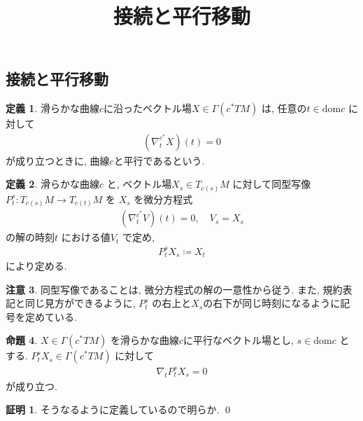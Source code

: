 \documentclass[10pt, fleqn, label-section=none]{bxjsarticle}
\title{接続と平行移動}
\date{}
\author{}
\theoremstyle{definition}
\newtheorem{dfn}{定義}[section]
\newtheorem{prop}[dfn]{命題}
\newtheorem*{pf*}{証明}
\newtheorem{remark}[dfn]{注意}
\newcommand{\dom}{\textrm{dom}}
\renewcommand{\;}{\, ; \,}
\begin{document}
\maketitle

\section{}

\subsection{接続と平行移動}

\begin{dfn}滑らかな曲線$c$に沿ったベクトル場$X \in \Gamma(c^* TM)$ は, 任意の$t \in \dom c$ に対して
\begin{align*} (\nabla^{c^*}_t X )(t) = 0 \end{align*}
が成り立つときに, 曲線$c$と平行であるという. 
\end{dfn}

\begin{dfn}滑らかな曲線$c$ と, ベクトル場$X_s \in T_{c(s)} M$ に対して同型写像$P^s_t : T_{c(s)} M \rightarrow T_{c(t)} M$ を
$X_s$ を微分方程式
\begin{align*} (\nabla^{c^*}_t V )(t) = 0, \quad V_s = X_s \end{align*}
の解の時刻$t$ における値$V_t$ で定め, 
\begin{align*} P^s_t X_s \coloneqq X_t\end{align*}
により定める. 
\end{dfn}

\begin{remark}
同型写像であることは, 微分方程式の解の一意性から従う. また, 規約表記と同じ見方ができるように, $P^s_t$ の右上と$X_s$の右下が同じ時刻になるように記号を定めている. 
\end{remark}


\begin{prop}$X \in \Gamma(c^* TM)$ を滑らかな曲線$c$に平行なベクトル場とし, $s \in \dom c$ とする. $P^s_t X_s \in \Gamma(c^* TM)$ に対して
\begin{align*} \nabla_t P^{s}_t X_{s} = 0  \end{align*}
が成り立つ. 
\end{prop}
\begin{pf*}
そうなるように定義しているので明らか. 
\qed
\end{pf*}
\end{document}
